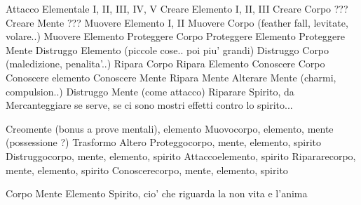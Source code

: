 \documentclass[12pt,a4paper,twoside,openany]{book}
\begin{document}
Attacco Elementale I, II, III, IV, V
Creare Elemento I, II, III
Creare Corpo  ???
Creare Mente  ???
Muovere Elemento I, II
Muovere Corpo (feather fall, levitate, volare..)
Muovere Elemento
Proteggere Corpo
Proteggere Elemento 
Proteggere Mente
Distruggo Elemento (piccole cose.. poi piu' grandi)
Distruggo Corpo (maledizione, penalita'..)
Ripara Corpo
Ripara Elemento
Conoscere Corpo
Conoscere elemento
Conoscere Mente
Ripara Mente
Alterare Mente (charmi, compulsion..)
Distruggo Mente (come attacco)
Riparare Spirito, da Mercanteggiare se serve, se ci sono mostri effetti contro lo spirito...


Creomente (bonus a prove mentali), elemento
Muovocorpo, elemento, mente (possessione ?)
Trasformo
Altero
Proteggocorpo, mente, elemento, spirito
Distruggocorpo, mente, elemento, spirito
Attaccoelemento, spirito
Ripararecorpo, mente, elemento, spirito
Conoscerecorpo, mente, elemento, spirito

Corpo
Mente
Elemento
Spirito, cio' che riguarda la non vita e l'anima
\end{document}
